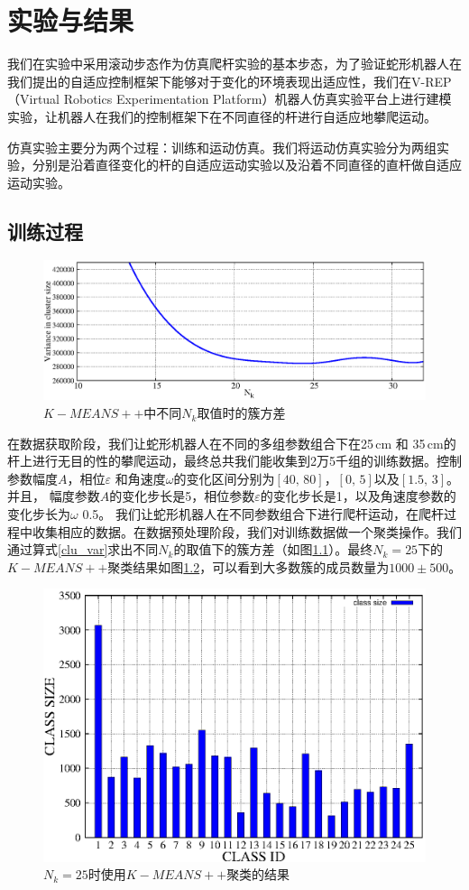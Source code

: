 \chapter{实验与结果}
\label{cha:experiment}
我们在实验中采用滚动步态作为仿真爬杆实验的基本步态，为了验证蛇形机器人在我们提出的自适应控制框架下能够对于变化的环境表现出适应性，我们在V-REP（Virtual Robotics Experimentation Platform）机器人仿真实验平台上进行建模实验，让机器人在我们的控制框架下在不同直径的杆进行自适应地攀爬运动。

仿真实验主要分为两个过程：训练和运动仿真。我们将运动仿真实验分为两组实验，分别是沿着直径变化的杆的自适应运动实验以及沿着不同直径的直杆做自适应运动实验。
\section{训练过程}
\begin{figure}[!h]
	\centering
	\includegraphics[width=0.9\linewidth,height=0.35\textheight]{figure/chap05/clusize.eps}
	\caption{$K-MEANS++$中不同$N_{k}$取值时的簇方差}
	\label{fig:clusize}
\end{figure}
在数据获取阶段，我们让蛇形机器人在不同的多组参数组合下在25\,cm 和 35\,cm的杆上进行无目的性的攀爬运动，最终总共我们能收集到2万5千组的训练数据。控制参数幅度$A$，相位$\varepsilon$ 和角速度$\omega$的变化区间分别为$[40, \, 80]$，$[0, \, 5]$以及$[1.5, \, 3]$。并且， 幅度参数$A$的变化步长是5，相位参数$\varepsilon$的变化步长是1，以及角速度参数的变化步长为$\omega$ 0.5。 我们让蛇形机器人在不同参数组合下进行爬杆运动，在爬杆过程中收集相应的数据。在数据预处理阶段，我们对训练数据做一个聚类操作。我们通过算式\ref{clu_var}求出不同$N_{k}$的取值下的簇方差（如图\ref{fig:clusize}）。最终$N_{k}=25$下的$K-MEANS++$聚类结果如图\ref{fig:clustersize}，可以看到大多数簇的成员数量为$1000 \pm 500 $。

\begin{figure}[t]
	\centering
	\includegraphics[width=0.6\linewidth]{figure/chap05/cluster.eps}
	\caption{$N_{k}=25$时使用$K-MEANS++$聚类的结果}
	\label{fig:clustersize}
\end{figure}

